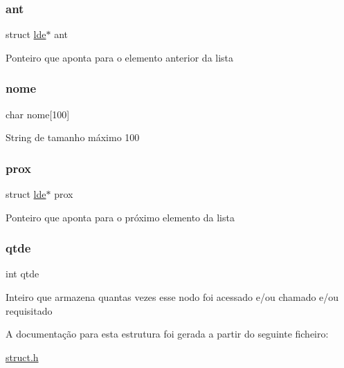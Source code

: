 \subsubsection{\texorpdfstring{ant}{ant}}
{\footnotesize\ttfamily struct \hyperlink{structlde}{lde}$\ast$ ant}

Ponteiro que aponta para o elemento anterior da lista \mbox{\label{structlde_aa4e90ca99702bac9e1c78503ad86acba}} 
\subsubsection{\texorpdfstring{nome}{nome}}
{\footnotesize\ttfamily char nome\mbox{[}100\mbox{]}}

String de tamanho máximo 100 \mbox{\label{structlde_a842cbaea6d55e782335dcad1a6992695}} 
\subsubsection{\texorpdfstring{prox}{prox}}
{\footnotesize\ttfamily struct \hyperlink{structlde}{lde}$\ast$ prox}

Ponteiro que aponta para o próximo elemento da lista \mbox{\label{structlde_aa8a45bf920d47706309cd931134d5219}} 
\subsubsection{\texorpdfstring{qtde}{qtde}}
{\footnotesize\ttfamily int qtde}

Inteiro que armazena quantas vezes esse nodo foi acessado e/ou chamado e/ou requisitado 

A documentação para esta estrutura foi gerada a partir do seguinte ficheiro\+:\begin{DoxyCompactItemize}
\item 
\hyperlink{struct_8h}{struct.\+h}\end{DoxyCompactItemize}
